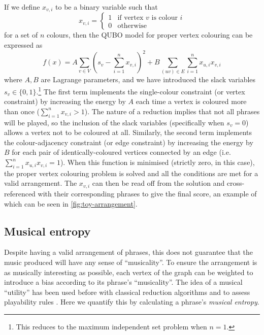 \documentclass[twocolumn]{article}
\theoremstyle{definition}
\begin{document}
If we define $x_{v,i}$ to be a binary variable such that
\begin{equation}
    x_{v,i} =
    \begin{cases}
        1 & \text{if vertex $v$ is colour $i$} \\
        0 & \text{otherwise}
    \end{cases}
\end{equation}
for a set of $n$ colours, then the QUBO model for proper vertex colouring can be expressed as
\begin{equation}
    f(x)=A\sum_{v \in V}\left(s_v-\sum_{i=1}^{n} x_{v,i}\right)^2+B\sum_{(uv) \in E}\sum_{i=1}^n x_{u,i}x_{v,i}
    \label{eq:colouring}
\end{equation}
where $A,B$ are Lagrange parameters, and we have introduced the slack variables $s_v\in\{0,1\}$.\footnote{This reduces to the maximum independent set problem when $n=1$.} The first term implements the single-colour constraint (or vertex constraint) by increasing the energy by $A$ each time a vertex is coloured more than once ($\sum_{i=1}^{n} x_{v,i}>1$). The nature of a reduction implies that not all phrases will be played, so the inclusion of the slack variables (specifically when $s_v=0$) allows a vertex not to be coloured at all. Similarly, the second term implements the colour-adjacency constraint (or edge constraint) by increasing the energy by $B$ for each pair of identically-coloured vertices connected by an edge (i.e.\ $\sum_{i=1}^n x_{u,i}x_{v,i}=1$). When this function is minimised (strictly zero, in this case), the proper vertex colouring problem is solved and all the conditions are met for a valid arrangement. The $x_{v,i}$ can then be read off from the solution and cross-referenced with their corresponding phrases to give the final score, an example of which can be seen in \cref{fig:toy-arrangement}.

\subsection*{Musical entropy}

Despite having a valid arrangement of phrases, this does not guarantee that the music produced will have any sense of ``musicality''. To ensure the arrangement is as musically interesting as possible, each vertex of the graph can be weighted to introduce a bias according to its phrase's ``musicality''. The idea of a musical ``utility'' has been used before with classical reduction algorithms \cite{huang_towards_2012} and to assess playability rules \cite{chiu_automatic_2009}. Here we quantify this by calculating a phrase's \emph{musical entropy}.
\end{document}
